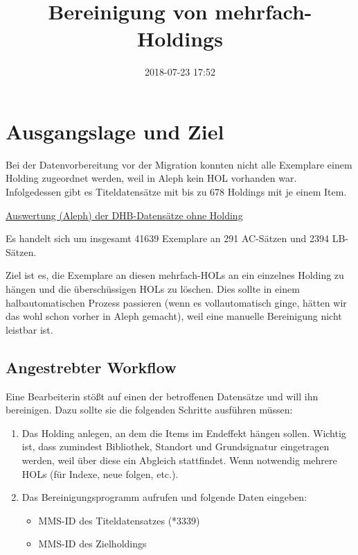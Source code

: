\documentclass[10pt, a4paper]{scrartcl}
\date{2018-07-23 17:52}
\title{Bereinigung von mehrfach-Holdings}
\begin{document}
\maketitle
\tableofcontents



\section{Ausgangslage und Ziel}
\label{sec:org6604db8}
Bei der Datenvorbereitung vor der Migration konnten nicht alle Exemplare einem
Holding zugeordnet werden, weil in Aleph kein HOL vorhanden war. Infolgedessen
gibt es Titeldatensätze mit bis zu 678 Holdings mit je einem Item.

\href{data/DHB\_ITEMS\_ohne\_HOL\_20180717.xlsx}{Auswertung (Aleph) der DHB-Datensätze ohne Holding}

Es handelt sich um insgesamt 41639 Exemplare an 291 AC-Sätzen und 2394 LB-Sätzen.

Ziel ist es, die Exemplare an diesen mehrfach-HOLs an ein einzelnes Holding zu
hängen und die überschüssigen HOLs zu löschen. Dies sollte in einem
halbautomatischen Prozess passieren (wenn es vollautomatisch ginge, hätten wir
das wohl schon vorher in Aleph gemacht), weil eine manuelle Bereinigung nicht
leistbar ist.

\subsection{Angestrebter Workflow}
\label{sec:orgdf683e4}
Eine Bearbeiterin stößt auf einen der betroffenen Datensätze und will ihn
bereinigen. Dazu sollte sie die folgenden Schritte ausführen müssen:

\begin{enumerate}
\item Das Holding anlegen, an dem die Items im Endeffekt hängen sollen. Wichtig
ist, dass zumindest Bibliothek, Standort und Grundsignatur eingetragen
werden, weil über diese ein Abgleich stattfindet. Wenn notwendig mehrere
HOLs (für Indexe, neue folgen, etc.).
\item Das Bereinigungsprogramm aufrufen und folgende Daten eingeben:
\begin{itemize}
\item MMS-ID des Titeldatensatzes (*3339)
\item MMS-ID des Zielholdings
\end{itemize}
\end{enumerate}
\end{document}

